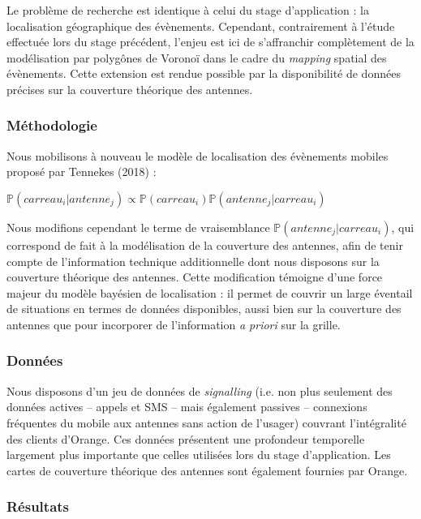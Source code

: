 Le problème de recherche est identique à celui du stage d'application : la localisation géographique des évènements. Cependant, contrairement à l'étude effectuée lors du stage précédent, l'enjeu est ici de s'affranchir complètement de la modélisation par polygônes de Voronoï dans le cadre du \textit{mapping} spatial des évènements. Cette extension est rendue possible par la disponibilité de données précises sur la couverture théorique des antennes.

\subsubsection*{Méthodologie}

Nous mobilisons à nouveau le modèle de localisation des évènements mobiles proposé par Tennekes (2018) : \begin{center}

\begingroup
\large
$\mathbb{P}(carreau_i | antenne_j) \propto \mathbb{P}(carreau_i) \mathbb{P}(antenne_j | carreau_i)$
\endgroup
\end{center}

Nous modifions cependant le terme de vraisemblance $\mathbb{P}(antenne_j | carreau_i)$, qui correspond de fait à la modélisation de la couverture des antennes, afin de tenir compte de l'information technique additionnelle dont nous disposons sur la couverture théorique des antennes. Cette modification témoigne d'une force majeur du modèle bayésien de localisation : il permet de couvrir un large éventail de situations en termes de données disponibles, aussi bien sur la couverture des antennes que pour incorporer de l'information \textit{a priori} sur la grille.

\subsubsection*{Données}

Nous disposons d'un jeu de données de \textit{signalling} (i.e. non plus seulement des données actives -- appels et SMS -- mais également passives -- connexions fréquentes du mobile aux antennes sans action de l'usager) couvrant l'intégralité des clients d'Orange. Ces données présentent une profondeur temporelle largement plus importante que celles utilisées lors du stage d'application. Les cartes de couverture théorique des antennes sont également fournies par Orange.

\subsubsection*{Résultats}

